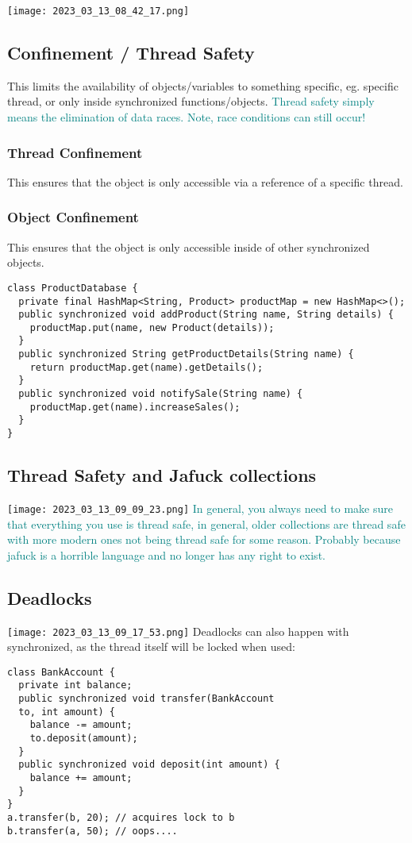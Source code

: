 \documentclass[main.tex,fontsize=8pt,paper=a4,paper=portrait,DIV=calc,]{scrartcl}
\begin{document}
\texttt{[image: 2023\_03\_13\_08\_42\_17.png]}

\subsection{Confinement / Thread Safety}
This limits the availability of objects/variables to something specific, eg. specific thread, or only inside synchronized functions/objects.\newline
\textcolor{teal}{Thread safety simply means the elimination of data races. Note, race conditions can still occur!}

\subsubsection{Thread Confinement}
This ensures that the object is only accessible via a reference of a specific thread.

\subsubsection{Object Confinement}
This ensures that the object is only accessible inside of other synchronized objects.
\begin{lstlisting}
class ProductDatabase {
  private final HashMap<String, Product> productMap = new HashMap<>();
  public synchronized void addProduct(String name, String details) {
    productMap.put(name, new Product(details));
  }
  public synchronized String getProductDetails(String name) {
    return productMap.get(name).getDetails();
  }
  public synchronized void notifySale(String name) {
    productMap.get(name).increaseSales();
  }
}
\end{lstlisting}

\subsection{Thread Safety and Jafuck collections}
\texttt{[image: 2023\_03\_13\_09\_09\_23.png]}\newline
\textcolor{teal}{In general, you always need to make sure that everything you use is thread safe, in general, older collections are thread safe with more modern ones not being thread safe for some reason.\newline
Probably because jafuck is a horrible language and no longer has any right to exist.}

\subsection{Deadlocks}
\texttt{[image: 2023\_03\_13\_09\_17\_53.png]}\newline
Deadlocks can also happen with synchronized, as the thread itself will be locked when used: 
\begin{lstlisting}
class BankAccount {
  private int balance;
  public synchronized void transfer(BankAccount
  to, int amount) {
    balance -= amount;
    to.deposit(amount);
  }
  public synchronized void deposit(int amount) {
    balance += amount;
  }
}
a.transfer(b, 20); // acquires lock to b
b.transfer(a, 50); // oops....
\end{lstlisting}
\end{document}
